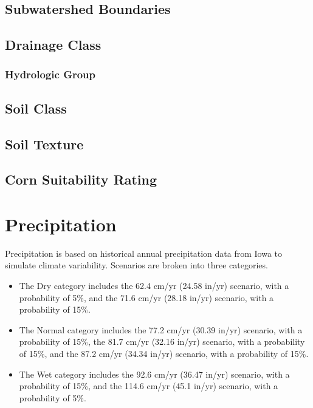 \documentclass[11pt]{article}
\begin{document}
\subsection{Subwatershed Boundaries}

\subsection{Drainage Class}

\subsubsection{Hydrologic Group}

\subsection{Soil Class}

\subsection{Soil Texture}

\subsection{Corn Suitability Rating}


\newpage
\section{Precipitation}
Precipitation is based on historical annual precipitation data from Iowa to simulate climate variability. Scenarios are broken into three categories. 
\begin{itemize}
  \item The Dry category includes the 62.4 cm/yr (24.58 in/yr) scenario, with a probability of 5\%, and the 71.6 cm/yr (28.18 in/yr) scenario, with a probability of 15\%. 
  \item The Normal category includes the 77.2 cm/yr (30.39 in/yr) scenario, with a probability of 15\%, the 81.7 cm/yr (32.16 in/yr) scenario, with a probability of 15\%, and the 87.2 cm/yr (34.34 in/yr) scenario, with a probability of 15\%.
  \item The Wet category includes the 92.6 cm/yr (36.47 in/yr) scenario, with a probability of 15\%, and the 114.6 cm/yr (45.1 in/yr) scenario, with a probability of 5\%.
\end{itemize}
\end{document}
